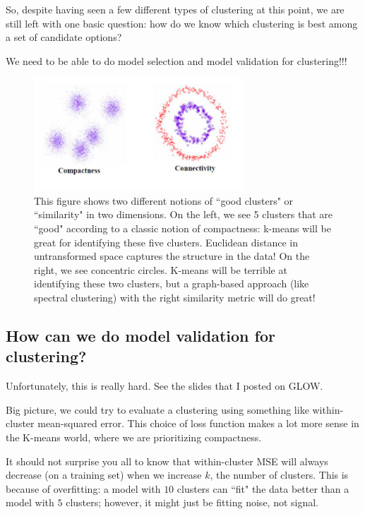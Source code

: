 So, despite having seen a few different types of clustering at this point, we are still left with one basic question: how do we know which clustering is best among a set of candidate options?

We need to be able to do model selection and model validation for clustering!!!


\begin{figure}
\centering
\includegraphics[width=0.7\textwidth]{442_lecs/compactconnect.png}	
\caption{This figure shows two different notions of ``good clusters" or ``similarity" in two dimensions. On the left, we see 5 clusters that are ``good" according to a classic notion of compactness: k-means will be great for identifying these five clusters. Euclidean distance in untransformed space captures the structure in the data! On the right, we see concentric circles. K-means will be terrible at identifying these two clusters, but a graph-based approach (like spectral clustering) with the right similarity metric will do great!}
\label{compact_connect}
\end{figure}


\subsection{How can we do model validation for clustering?}

Unfortunately, this is really hard. See the slides that I posted on GLOW.

Big picture, we could try to evaluate a clustering using something like within-cluster mean-squared error. This choice of loss function makes a lot more sense in the K-means world, where we are prioritizing compactness. 

It should not surprise you all to know that within-cluster MSE will always decrease (on a training set) when we increase $k$, the number of clusters. This is because of overfitting: a model with $10$ clusters can ``fit" the data better than a model with $5$ clusters; however, it might just be fitting noise, not signal.

